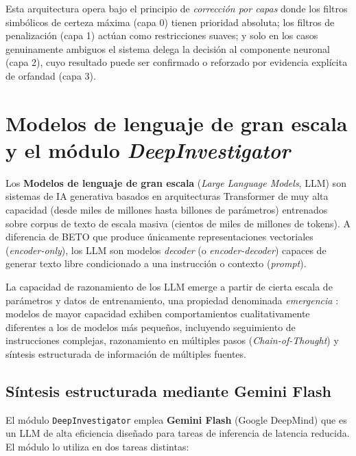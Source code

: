 Esta arquitectura opera bajo el principio de \textit{corrección por capas} donde
los filtros simbólicos de certeza máxima (capa 0) tienen prioridad absoluta; los
filtros de penalización (capa 1) actúan como restricciones suaves; y solo en
los casos genuinamente ambiguos el sistema delega la decisión al componente
neuronal (capa 2), cuyo resultado puede ser confirmado o reforzado por evidencia
explícita de orfandad (capa 3).



\section{Modelos de lenguaje de gran escala y el módulo \textit{DeepInvestigator}}
\label{sec:mt_llm}

Los \textbf{Modelos de lenguaje de gran escala} (\textit{Large Language Models}, LLM) \cite{brown2020language} son sistemas de IA generativa basados en arquitecturas
Transformer de muy alta capacidad (desde miles de millones hasta billones de
parámetros) entrenados sobre corpus de texto de escala masiva (cientos de miles
de millones de tokens). A diferencia de BETO que produce únicamente representaciones
vectoriales (\textit{encoder-only}), los LLM son modelos \textit{decoder} (o
\textit{encoder-decoder}) capaces de generar texto libre condicionado a una
instrucción o contexto (\textit{prompt}).

La capacidad de razonamiento de los LLM emerge a partir de cierta escala de
parámetros y datos de entrenamiento, una propiedad denominada
\textit{emergencia} \cite{wei2022emergent}: modelos de mayor capacidad
exhiben comportamientos cualitativamente diferentes a los de modelos más pequeños,
incluyendo seguimiento de instrucciones complejas, razonamiento en múltiples pasos
(\textit{Chain-of-Thought}) y síntesis estructurada de información de múltiples
fuentes.

\subsection{Síntesis estructurada mediante Gemini Flash}
\label{subsec:mt_gemini}

El módulo \texttt{DeepInvestigator} emplea \textbf{Gemini Flash} (Google DeepMind)
\cite{google2023gemini} que es un LLM de alta eficiencia diseñado para tareas de
inferencia de latencia reducida. El módulo lo utiliza en dos tareas distintas:

